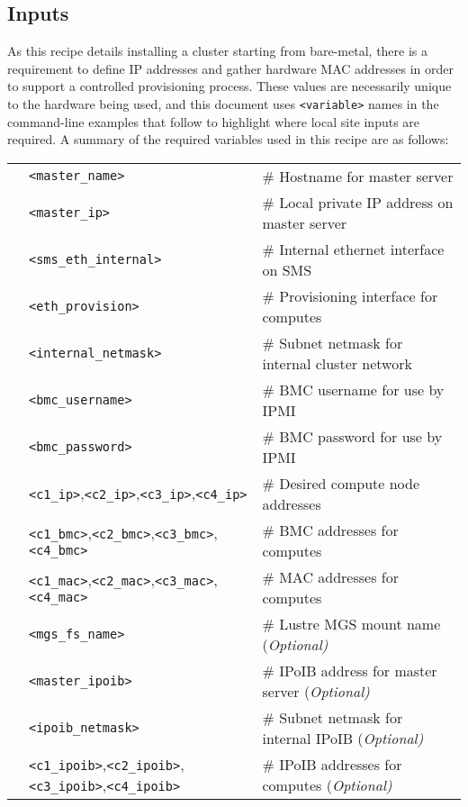 \subsection{Inputs}
As this recipe details installing a cluster
starting from bare-metal, there is a requirement to define IP addresses and gather
hardware MAC addresses in order to support a controlled provisioning process. These values
are necessarily unique to the hardware being used, and this document uses \texttt{<variable>}
names in the command-line examples that follow to highlight where local site
inputs are required. A summary of the required variables used in this recipe
are as follows: \\

\vspace*{0.2cm}
\begin{tabular}{@{}>{\textbullet}cll@{}}
& \texttt{<master\_name>}  & {\small \# Hostname for master server} \\
& \texttt{<master\_ip>} & {\small \# Local private IP address on master server}  \\
& \texttt{<sms\_eth\_internal>} & {\small \# Internal ethernet interface on SMS} \\
& \texttt{<eth\_provision>} & {\small \# Provisioning interface for computes} \\
& \texttt{<internal\_netmask>} & {\small \# Subnet netmask for internal cluster network} \\
& \texttt{<bmc\_username>} & {\small \# BMC username for use by IPMI} \\
& \texttt{<bmc\_password>} & {\small \# BMC password for use by IPMI} \\
& \texttt{<c1\_ip>},\texttt{<c2\_ip>},\texttt{<c3\_ip>},\texttt{<c4\_ip>}
& {\small \# Desired compute node addresses} \\
& \texttt{<c1\_bmc>},\texttt{<c2\_bmc>},\texttt{<c3\_bmc>},\texttt{<c4\_bmc>}
& {\small \# BMC addresses for computes} \\
& \texttt{<c1\_mac>},\texttt{<c2\_mac>},\texttt{<c3\_mac>},\texttt{<c4\_mac>}
& {\small \# MAC addresses for computes} \\
& \texttt{<mgs\_fs\_name>} & {\small \# Lustre MGS mount name (\em Optional)} \\
& \texttt{<master\_ipoib>} & {\small \# IPoIB address for master server (\em Optional)} \\
& \texttt{<ipoib\_netmask>} & {\small \# Subnet netmask for internal IPoIB (\em Optional)} \\
& \texttt{<c1\_ipoib>},\texttt{<c2\_ipoib>},\texttt{<c3\_ipoib>},\texttt{<c4\_ipoib>}
& {\small \# IPoIB addresses for computes (\em Optional)}\\

\end{tabular}
